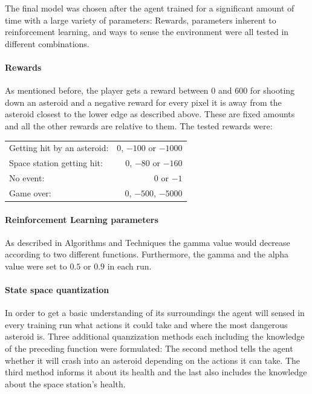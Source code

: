 \documentclass[a4paper,10pt]{article}
\begin{document}

The final model was chosen after the agent trained for a significant amount of time with a large variety of parameters: 
Rewards, parameters inherent to reinforcement learning, and ways to sense the environment were all tested in different combinations.

\paragraph{Rewards}
As mentioned before, the player gets a reward between 0 and 600 for shooting down an asteroid and a negative reward for every pixel it is away from the asteroid closest to the lower edge as described above.
These are fixed amounts and all the other rewards are relative to them.
The tested rewards were:
\begin{center}
\begin{tabular}{lr}
Getting hit by an asteroid: & $0$, $-100$ or $-1000$\\
Space station getting hit: & $0$, $-80$ or $-160$\\
No event: & $0$ or $-1$\\
Game over: & $0$, $-500$, $-5000$\\
\end{tabular}
\end{center}

\paragraph{Reinforcement Learning parameters}
As described in Algorithms and Techniques the gamma value would decrease according to two different functions.
Furthermore, the gamma and the alpha value were set to $0.5$ or $0.9$ in each run.

\paragraph{State space quantization}
In order to get a basic understanding of its surroundings the agent will sensed in every training run what actions it could take and where the most dangerous asteroid is.
Three additional quanzization methods each including the knowledge of the preceding function were formulated:
The second method tells the agent whether it will crash into an asteroid depending on the actions it can take.
The third method informs it about its health and the last also includes the knowledge about the space station's health.
\end{document}
